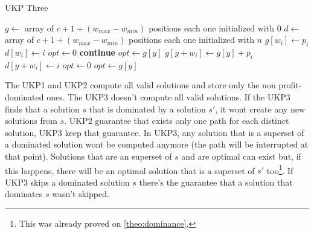 \documentclass[12pt]{article}
\begin{document}
\begin{algorithm}
\caption{UKP Three}\label{alg:ukp3}
\begin{algorithmic}[1]
  \State \(g \gets\) array of \(c + 1 + (w_{max} - w_{min})\) positions each one initialized with \(0\)\label{ukp3:create_g}
  \State \(d \gets\) array of \(c + 1 + (w_{max} - w_{min})\) positions each one initialized with \(n\)\label{ukp3:create_d}
  \State %
  \label{ukp3:begin_trivial_bounds}
      \State \(g[w_i] \gets p_i\)
      \State \(d[w_i] \gets i\)
    \EndIf
  \EndFor\label{ukp3:end_trivial_bounds}
  \State %
  \State \underline{\(opt \gets 0\)}
  \label{ukp3:main_ext_loop_begin}
    \label{ukp3:if_no_greater_than_opt}
    	\State \textbf{continue}
    \EndIf
    \State %
    \State \underline{\(opt \gets g[y]\)}
    \State %
    \label{ukp3:main_inner_loop_begin}
      \label{ukp3:if_better_solution_begin}
        \State \(g[y + w_i] \gets g[y] + p_i\)
        \State \(d[y + w_i] \gets i\)
      \EndIf\label{ukp3:if_better_solution_end}
    \EndFor\label{ukp3:main_inner_loop_end}
  \EndFor\label{ukp3:main_ext_loop_end}
  \State %
  \State \sout{\(opt \gets 0\)}
  \label{ukp3:get_opt_loop_begin}
    \label{ukp3:opt_loop_if}
      \State \(opt \gets g[y]\)
    \EndIf
  \EndFor\label{ukp3:get_opt_loop_end}
\EndProcedure
\end{algorithmic}
\end{algorithm}

The UKP1 and UKP2 compute all valid solutions and store only the non profit-dominated ones. The UKP3 doesn't compute all valid solutions. If the UKP3 finds that a solution \(s\) that is dominated by a solution \(s'\), it wont create any new solutions from \(s\). UKP2 guarantee that exists only one path for each distinct solution, UKP3 keep that guarantee. In UKP3, any solution that is a superset of a dominated solution wont be computed anymore (the path will be interrupted at that point). Solutions that are an superset of \(s\) and are optimal can exist but, if this happens, there will be an optimal solution that is a superset of \(s'\) too\footnote{This was already proved on \autoref{theo:dominance}.}. If UKP3 skips a dominated solution \(s\) there's the guarantee that a solution that dominates \(s\) wasn't skipped.
\end{document}
